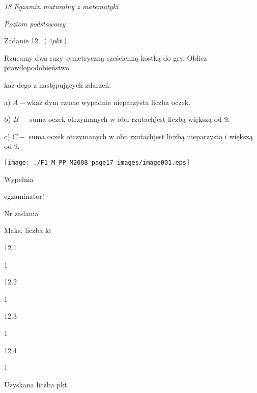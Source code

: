 \documentclass[a4paper,12pt]{article}
\begin{document}
{\it 18 Egzamin maturalny z matematyki}

{\it Poziom podstawowy}

Zadanie 12. $(4pkt)$

Rzucamy dwa razy symetryczną sześcienną kostką do gry. Oblicz prawdopodobieństwo

$\mathrm{k}\mathrm{a}\dot{\mathrm{z}}$ dego z następujących zdarzeń:

a) $A-\mathrm{w}\mathrm{k}\mathrm{a}\dot{\mathrm{z}}$ dym rzucie wypadnie nieparzysta liczba oczek.

b) $B-$ suma oczek otrzymanych w obu rzutachjest liczbą większą od 9.

c) $C-$ suma oczek otrzymanych w obu rzutachjest liczbą nieparzystą i większą od 9.
\begin{center}
\texttt{[image: ./F1\_M\_PP\_M2008\_page17\_images/image001.eps]}
\end{center}
Wypelnia

egzaminator!

Nr zadania

Maks. liczba kt

12.1

1

12.2

1

12.3

1

12.4

1

Uzyskana liczba pkt
\end{document}
